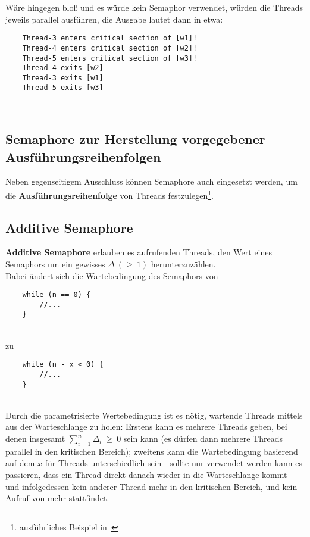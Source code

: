 \noindent
Wäre  hingegen bloß  und es würde kein Semaphor verwendet, würden die Threads jeweils parallel  ausführen, die Ausgabe lautet dann in etwa:


\begin{verbatim}
    Thread-3 enters critical section of [w1]!
    Thread-4 enters critical section of [w2]!
    Thread-5 enters critical section of [w3]!
    Thread-4 exits [w2]
    Thread-3 exits [w1]
    Thread-5 exits [w3]
\end{verbatim}\\

\subsection{Semaphore zur Herstellung vorgegebener Ausführungsreihenfolgen}

Neben gegenseitigem Ausschluss können Semaphore auch eingesetzt werden, um die \textbf{Ausführungsreihenfolge} von Threads festzulegen\footnote{ausführliches Beispiel in~\cite[104]{Oec22}}.

\subsection{Additive Semaphore}
\textbf{Additive Semaphore} erlauben es aufrufenden Threads, den Wert eines Semaphors um ein gewisses $\Delta\ (\geq\ 1)$ herunterzuzählen.\\

\noindent
Dabei ändert sich die Wartebedingung des Semaphors von

\begin{verbatim}
    while (n == 0) {
        //...
    }
\end{verbatim}\\

zu

\begin{verbatim}
    while (n - x < 0) {
        //...
    }
\end{verbatim}\\

\noindent
Durch die parametrisierte Wertebedingung ist es nötig, wartende Threads mittels  aus der Warteschlange zu holen: Erstens kann es mehrere Threads geben, bei denen insgesamt $\sum_{i=1}^{n} \Delta_i\ \geq\ 0$ sein kann (es dürfen dann mehrere Threads parallel in den kritischen Bereich); zweitens kann die Wartebedingung basierend auf dem $x$ für Threads unterschiedlich sein - sollte nur  verwendet werden kann es passieren, dass ein Thread direkt danach wieder in die Warteschlange kommt - und infolgedessen kein anderer Thread mehr in den kritischen Bereich, und kein Aufruf von  mehr stattfindet.\\

